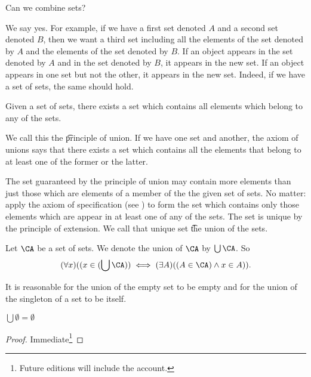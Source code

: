 

Can we combine sets?


We say yes. 
For example, if we have a first set denoted $A$ and a second set denoted $B$, then we want a third set including all the elements of the set denoted by $A$ and the elements of the set denoted by $B$.
If an object appears in the set denoted by $A$ and in the set denoted by $B$, it appears in the new set.
If an object appears in one set but not the other, it appears in the new set.
Indeed, if we have a set of sets, the same should hold.

\begin{principle}[Union]
	Given a set of sets, there exists a set which contains all elements which belong to any of the sets.	
\end{principle}
We call this the \t{principle of union}.
If we have one set and another, the axiom of unions says that there exists a set which contains all the elements that belong to at least one of the former or the latter.

The set guaranteed by the principle of union may contain more elements than just those which are elements of a member of the the given set of sets.
No matter: apply the axiom of specification (see ) to form the set which contains only those elements which are appear in at least one of any of the sets.
The set is unique by the principle of extension.
We call that unique set \t{the union} of the sets.


Let $\CA$ be a set of sets.
We denote the union of $\CA$ by $\bigcup \CA$.
So 
\[
	(\forall x)((x \in (\bigcup\CA)) \iff (\exists A)((A \in \CA) \land x \in A)).
\]


It is reasonable for the union of the empty set to be empty and for the union of the singleton of a set to be itself.

\begin{proposition}
	$\bigcup \emptyset = \emptyset$
\end{proposition}
\begin{proof}
Immediate\footnote{Future editions will include the account.}
\end{proof}

